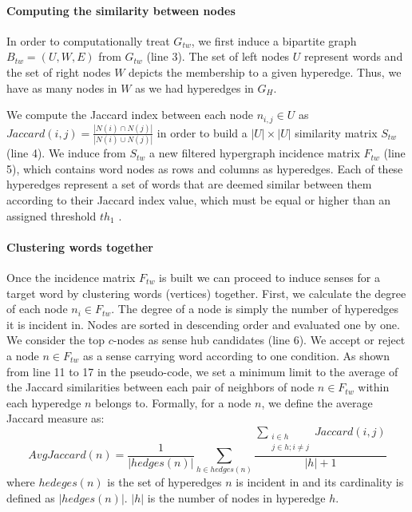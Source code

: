 \paragraph{Computing the similarity between nodes}
In order to computationally treat $G_{tw}$, we first induce a bipartite graph $B_{tw}=(U,W,E)$ from $G_{tw}$ (line 3). The set of left nodes $U$ represent words and the set of right nodes $W$ depicts the membership to a given hyperedge. Thus, we have as many nodes in $W$  as we had hyperedges in $G_H$.

We compute the Jaccard index between each node $n_{i,j} \in U$ as $Jaccard(i,j)=\frac{|N(i)\cap N(j)|}{|N(i)\cup N(j)|}$ in order to build a $|U|\times|U|$ similarity matrix $S_{tw}$ (line 4). We induce from $S_{tw}$ a new filtered  hypergraph incidence matrix $F_{tw}$ (line 5), which contains word nodes as rows and columns as hyperedges. Each of these hyperedges represent a set of words that are deemed similar between them according to their Jaccard  index value, which must be equal or higher than an assigned threshold $th_1$ .  

\paragraph{Clustering words  together}
Once the incidence matrix $F_{tw}$ is built we can proceed to induce senses for a target word by clustering words (vertices) together. First, we calculate the degree of each node $n_i \in F_{tw}$. The degree of a node is simply the number of hyperedges it is incident in. Nodes are sorted in descending order and evaluated one by one. We consider the top $c$-nodes as sense hub candidates (line 6). We accept or reject a node $n \in F_{tw}$ as a sense carrying word according to one condition. As shown from line 11 to 17 in the pseudo-code, we set a minimum limit to the average of the Jaccard similarities between each pair of neighbors of node $n \in F_{tw}$ within each hyperedge  $n$ belongs to. Formally, for a node $n$, we define the average Jaccard measure as: $$AvgJaccard(n)=\frac{1}{|hedges(n)|}\sum_{h\in hedges(n)}\frac{\sum_{\substack{i\in h\\j\in h;i\neq j}}Jaccard(i,j)}{|h| + 1}$$ 
where $hedeges(n)$ is the set of hyperedges $n$ is incident in and its cardinality is defined as $|hedges(n)|$. $|h|$ is the number of nodes in hyperedge $h$. 

